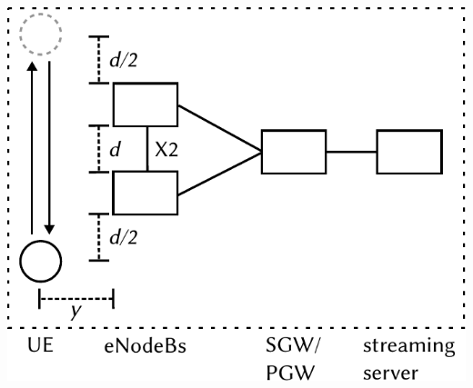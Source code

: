 \documentclass{beamer}
\begin{document}
\begin{frame}
\begin{columns}[T]
		\begin{center}
			\includegraphics[width=0.7\columnwidth]{../../chapters/06-mobilestreamingmeasurements/images/streaming-simulation-mobility.pdf}
		\end{center}
	\end{columns}

\end{frame}






	


\end{document}
